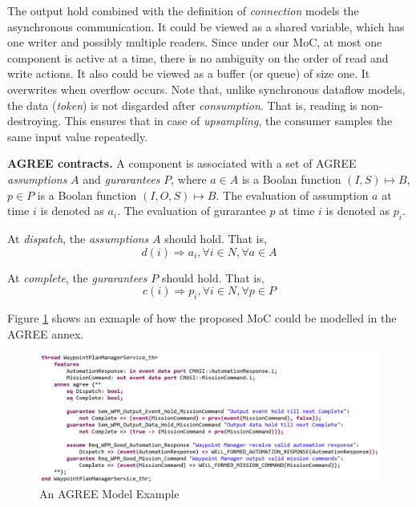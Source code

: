 The output hold combined with the definition of \emph{connection} models the asynchronous communication. It could be viewed as a shared variable, which has one writer and possibly multiple readers. Since under our MoC, at most one component is active at a time, there is no ambiguity on the order of read and write actions. It also could be viewed as a buffer (or queue) of size one. It overwrites when overflow occurs. Note that, unlike synchronous dataflow models, the data (\emph{token}) is not disgarded after \emph{consumption}. That is, reading is non-destroying. This ensures that in case of \emph{upsampling}, the consumer samples the same input value repeatedly. 

{\bf AGREE contracts.}
A component is associated with a set of AGREE \emph{assumptions} $A$ and \emph{gurarantees} $P$, where $a \in A$ is a Boolan function $(I, S) \mapsto B$, $p \in P$ is a Boolan function $(I, O, S) \mapsto B$. The evaluation of assumption $a$ at time $i$ is denoted as $a_i$. The evaluation of gurarantee $p$ at time $i$ is denoted as $p_i$. 
	
At \emph{dispatch}, the \emph{assumptions} $A$ should hold. That is,
$$d(i) \Rightarrow a_i, \forall i\in N, \forall a \in A $$

At \emph{complete}, the \emph{gurarantees} $P$ should hold. That is,
$$c(i) \Rightarrow p_i, \forall i\in N, \forall p \in P $$


Figure \ref{wpmAGREE} shows an exmaple of how the proposed MoC could be modelled in the AGREE annex.

\begin{figure}[ht!]
\centering
\includegraphics[width=120mm]{wpmAGREE.jpg}
\caption{An AGREE Model Example\label{wpmAGREE}}
\end{figure}

